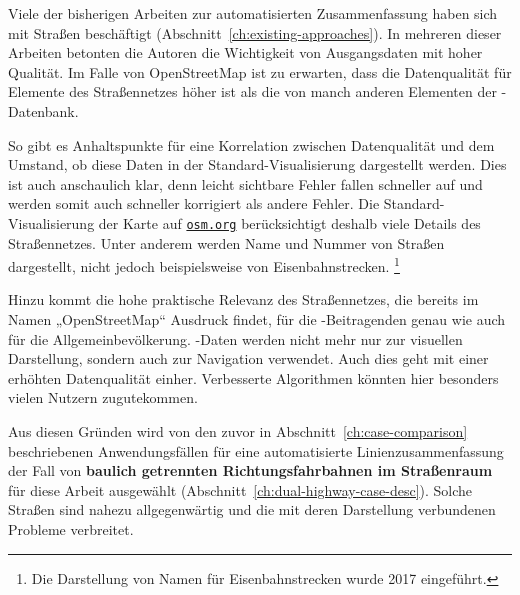 \documentclass[../main/thesis.tex]{subfiles}
\begin{document}
Viele der bisherigen Arbeiten zur automatisierten Zusammenfassung haben sich mit Straßen beschäftigt (Abschnitt~\ref{ch:existing-approaches}).
In mehreren dieser Arbeiten betonten die Autoren die Wichtigkeit von Ausgangsdaten mit hoher Qualität.
Im Falle von OpenStreetMap ist zu erwarten, dass die Datenqualität für Elemente des Straßennetzes höher ist als die von manch anderen Elementen der \osm-Datenbank.

So gibt es Anhaltspunkte für eine Korrelation zwischen Datenqualität und dem Umstand, ob diese Daten in der Standard-Visualisierung dargestellt werden. 
Dies ist auch anschaulich klar, denn leicht sichtbare Fehler fallen schneller auf und werden somit auch schneller korrigiert als andere Fehler.
Die Standard-Visualisierung der Karte auf \href{https://www.openstreetmap.org/}{\nolinkurl{osm.org}} berücksichtigt deshalb viele Details des Straßennetzes.
Unter anderem werden Name und Nummer von Straßen dargestellt, nicht jedoch beispielsweise von Eisenbahnstrecken.%
\footnote{Die Darstellung von Namen für Eisenbahnstrecken wurde 2017 eingeführt.}

Hinzu kommt die hohe praktische Relevanz des Straßennetzes, die bereits im Namen „OpenStreetMap“ Ausdruck findet, für die \osm-Beitragenden genau wie auch für die Allgemeinbevölkerung.
\osm-Daten werden nicht mehr nur zur visuellen Darstellung, sondern auch zur Navigation verwendet.
Auch dies geht mit einer erhöhten Datenqualität einher. 
Verbesserte Algorithmen könnten hier besonders vielen Nutzern zugutekommen.

Aus diesen Gründen wird von den zuvor in Abschnitt~\ref{ch:case-comparison} beschriebenen Anwendungsfällen für eine automatisierte Linienzusammenfassung der Fall von \textbf{baulich getrennten Richtungsfahrbahnen im Straßenraum} für diese Arbeit ausgewählt (Abschnitt~\ref{ch:dual-highway-case-desc}).
Solche Straßen sind nahezu allgegenwärtig und die mit deren Darstellung verbundenen Probleme verbreitet.
\end{document}

